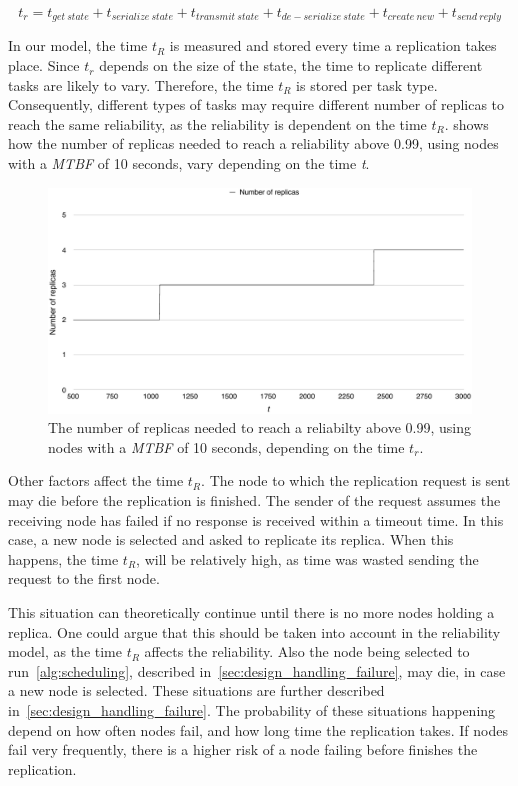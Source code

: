 \documentclass{cslthse-msc}
\begin{document}
\begin{equation} \label{eq:replication_time}
t_{r} = t_{get\ state} + t_{serialize\ state} + t_{transmit\ state} + t_{de-serialize\ state} + t_{create\ new} + t_{send\ reply}
\end{equation} 

In our model, the time $t_{R}$ is measured and stored every time a replication takes place. Since $t_{r}$ depends on the size of the state, the time to replicate different tasks are likely to vary. Therefore, the time $t_{R}$ is stored per task type. Consequently, different types of tasks may require different number of replicas to reach the same reliability, as the reliability is dependent on the time $t_R$.  shows how the number of replicas needed to reach a reliability above 0.99, using nodes with a \emph{MTBF} of 10 seconds, vary depending on the time \emph{t}.

\begin{figure}[!hbt]
\centering
\includegraphics[scale=0.5]{images/replicas_depending_on_t.pdf}
\caption[Number of replicas needed]{The number of replicas needed to reach a reliabilty above 0.99, using nodes with a \emph{MTBF} of 10 seconds, depending on the time $t_{r}$.}\label{fig:replicas_depending_on_t}
\end{figure}

Other factors affect the time $t_R$. The node to which the replication request is sent may die before the replication is finished. The sender of the request assumes the receiving node has failed if no response is received within a timeout time. In this case, a new node is selected and asked to replicate its replica. When this happens, the time $t_R$, will be relatively high, as time was wasted sending the request to the first node.

This situation can theoretically continue until there is no more nodes holding a replica. One could argue that this should be taken into account in the reliability model, as the time $t_R$ affects the reliability. Also the node being selected to run~\cref{alg:scheduling}, described in~\cref{sec:design_handling_failure}, may die, in case a new node is selected. These situations are further described in~\cref{sec:design_handling_failure}. The probability of these situations happening depend on how often nodes fail, and how long time the replication takes. If nodes fail very frequently, there is a higher risk of a node failing before finishes the replication.
\end{document}
